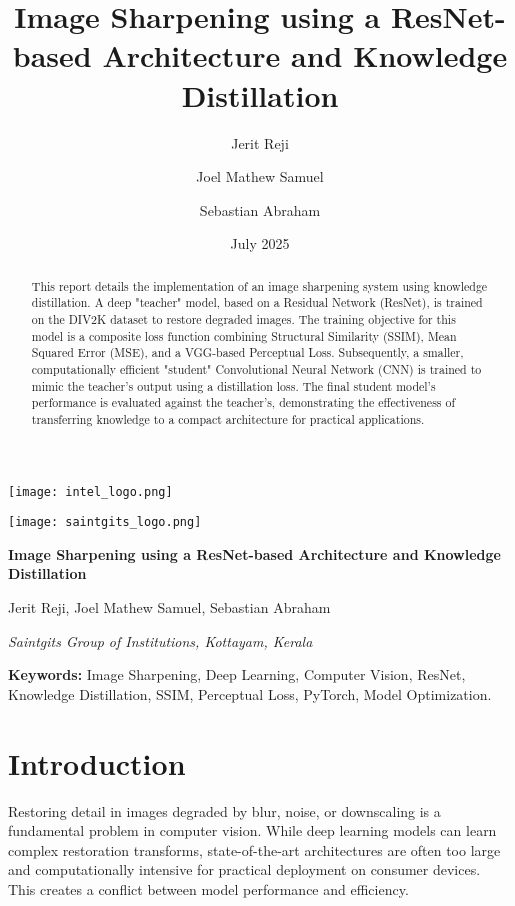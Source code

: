 \documentclass[12pt,a4paper]{article}
\title{Image Sharpening using a ResNet-based Architecture and Knowledge Distillation}
\author[1]{Jerit Reji}
\author[1]{Joel Mathew Samuel}
\author[1]{Sebastian Abraham}
\affil[1]{Saintgits Group of Institutions, Kottayam, Kerala}
\date{July 2025}
\begin{document}
\begin{titlepage}
    \thispagestyle{firstpage}

    \begin{minipage}{0.5\textwidth}
        \flushleft \texttt{[image: intel\_logo.png]}
    \end{minipage}%
    \begin{minipage}{0.5\textwidth}
        \flushright \texttt{[image: saintgits\_logo.png]}
    \end{minipage}

    \vfill
    \centering
    {\Huge\bfseries Image Sharpening using a ResNet-based Architecture and Knowledge Distillation \par}
    \vspace{1.5cm}
    {\Large Jerit Reji, Joel Mathew Samuel, Sebastian Abraham \par}
    \vspace{0.5cm}
    {\large \textit{Saintgits Group of Institutions, Kottayam, Kerala}\par}
    \vfill

\end{titlepage}

\restoregeometry
\pagestyle{fancy}

\begin{abstract}
\noindent This report details the implementation of an image sharpening system using knowledge distillation. A deep "teacher" model, based on a Residual Network (ResNet), is trained on the DIV2K dataset to restore degraded images. The training objective for this model is a composite loss function combining Structural Similarity (SSIM), Mean Squared Error (MSE), and a VGG-based Perceptual Loss. Subsequently, a smaller, computationally efficient "student" Convolutional Neural Network (CNN) is trained to mimic the teacher's output using a distillation loss. The final student model's performance is evaluated against the teacher's, demonstrating the effectiveness of transferring knowledge to a compact architecture for practical applications.
\end{abstract}

\vspace{0.5cm}
\textbf{Keywords:} Image Sharpening, Deep Learning, Computer Vision, ResNet, Knowledge Distillation, SSIM, Perceptual Loss, PyTorch, Model Optimization.
\vspace{1cm}

\section{Introduction}
Restoring detail in images degraded by blur, noise, or downscaling is a fundamental problem in computer vision. While deep learning models can learn complex restoration transforms, state-of-the-art architectures are often too large and computationally intensive for practical deployment on consumer devices. This creates a conflict between model performance and efficiency.
\end{document}

